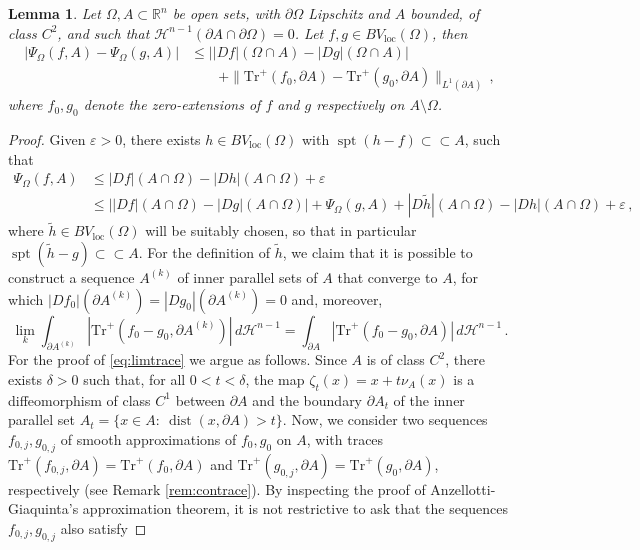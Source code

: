 \documentclass[a4paper,reqno,11pt]{amsart}
\newtheorem{lemma}[theorem]{Lemma}
\newcommand{\R}{\mathbb{R}}
\newcommand{\e}{\varepsilon}
\newcommand{\Hau}{{\mathcal H}} %
\newcommand{\de}{\partial}
\newcommand{\dist}{\mathop{\mathrm{dist}}}
\newcommand{\spt}{\mathop{\mathrm{spt}}}
\newcommand{\loc}{\mathop{\mathrm{loc}}}
\renewcommand{\Subset}{\subset\!\subset}
\newcommand{\Tr}{{\mathrm{Tr}}}
\begin{document}
\begin{lemma} \label{lem:upbmingap}
Let $\Omega, A \subset \R^n$ be open sets, with $\de\Omega$ Lipschitz and $A$ bounded, of class $C^{2}$, and such that $\Hau^{n-1}(\de A\cap \de \Omega) = 0$. Let $f,g\in BV_{\loc}(\Omega)$, then
\begin{align} \label{eq:finalpsi}
|\Psi_\Omega(f,A) - \Psi_\Omega(g,A)| & \leq \Big||Df|(\Omega \cap A) - |Dg|(\Omega \cap A)\Big| \\\nonumber
&\qquad + \|\Tr^+(f_{0}, \de A) - \Tr^+(g_{0},\de A)\|_{L^1(\de A)} \,,
\end{align}
where $f_{0}, g_{0}$ denote the zero-extensions of $f$ and $g$ respectively on $A\setminus \Omega$.
\end{lemma}
\begin{proof}
Given $\e>0$, there exists $h\in BV_{\loc}(\Omega)$ with $\spt(h-f)\Subset A$, such that
\begin{align}\label{eq:stimaPsi1}
\Psi_{\Omega}(f,A) &\le |Df|(A\cap \Omega) - |Dh|(A\cap \Omega) + \e\\\nonumber
&\le \big||Df|(A\cap \Omega) - |Dg|(A\cap \Omega)\big| + \Psi_{\Omega}(g,A) + |D\tilde{h}|(A\cap \Omega) - |Dh|(A\cap \Omega) + \e\,,
\end{align}
where $\tilde{h}\in BV_{\loc}(\Omega)$ will be suitably chosen, so that in particular $\spt(\tilde{h}-g)\Subset A$. For the definition of $\tilde{h}$, we claim that it is possible to construct a sequence $A^{(k)}$ of inner parallel sets of $A$ that converge to $A$, for which $|Df_{0}|(\de A^{(k)}) = |Dg_{0}|(\de A^{(k)}) = 0$ and, moreover, 
\begin{equation}\label{eq:limtrace}
\lim_{k} \int_{\de A^{(k)}} |\Tr^{+}(f_{0}-g_{0},\de A^{(k)})|\, d\Hau^{n-1} = \int_{\de A} |\Tr^{+}(f_{0}-g_{0},\de A)|\, d\Hau^{n-1}\,.
\end{equation}
For the proof of \eqref{eq:limtrace} we argue as follows. Since $A$ is of class $C^{2}$, there exists $\delta>0$ such that, for all $0<t<\delta$, the map $\zeta_{t}(x) = x+t\nu_{A}(x)$ is a diffeomorphism of class $C^{1}$ between $\de A$ and the boundary $\de A_{t}$ of the inner parallel set $A_{t} = \{x\in A:\ \dist(x,\de A)>t\}$. 
Now, we consider two sequences $f_{0,j}, g_{0,j}$ of smooth approximations of $f_{0},g_{0}$ on $A$, with traces $\Tr^{+}(f_{0,j},\de A) = \Tr^{+}(f_{0},\de A)$ and $\Tr^{+}(g_{0,j},\de A) = \Tr^{+}(g_{0},\de A)$, respectively (see Remark \ref{rem:contrace}). By inspecting the proof of Anzellotti-Giaquinta's approximation theorem, it is not restrictive to ask that the sequences $f_{0,j}, g_{0,j}$ also satisfy

\end{proof}
\end{document}
